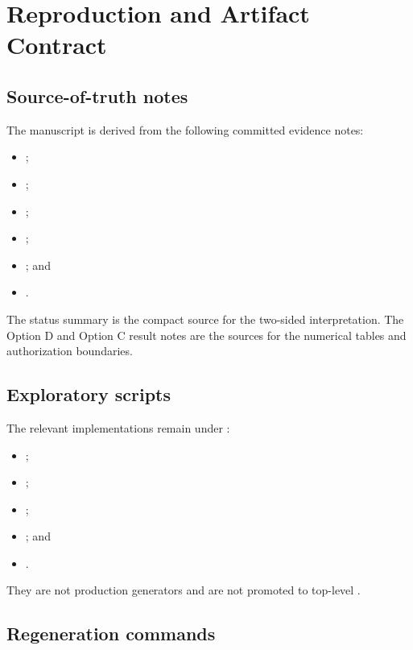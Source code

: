 \section{Reproduction and Artifact Contract}\label{sec:repro}

\subsection{Source-of-truth notes}

The manuscript is derived from the following committed evidence notes:
\begin{itemize}
  \item {};
  \item {};
  \item {};
  \item {};
  \item {}; and
  \item {}.
\end{itemize}
The status summary is the compact source for the two-sided interpretation.
The Option D and Option C result notes are the sources for the numerical tables
and authorization boundaries.

\subsection{Exploratory scripts}

The relevant implementations remain under
:
\begin{itemize}
  \item {};
  \item {};
  \item {};
  \item {}; and
  \item {}.
\end{itemize}
They are not production generators and are not promoted to top-level
.

\subsection{Regeneration commands}

